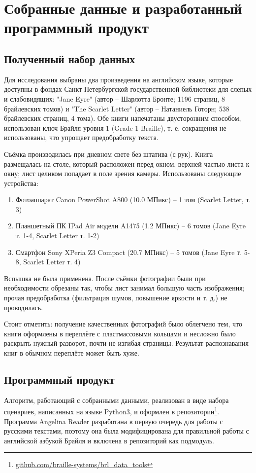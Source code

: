 \documentclass{main.tex}[subfiles]
\begin{document}
\section{Собранные данные и разработанный программный продукт}
\subsection{Полученный набор данных}

Для исследования выбраны два произведения на английском языке, которые доступны в фондах Санкт-Петербургской государственной библиотеки для слепых и слабовидящих: "Jane Eyre"\hspace{0pt} (автор -- Шарлотта Бронте; 1196 страниц, 8 брайлевских томов) и "The Scarlet Letter"\hspace{0pt} (автор -- Натаниель Готорн; 538 брайлевских страниц, 4 тома).
Обе книги напечатаны двусторонним способом, использован ключ Брайля уровня 1 (Grade 1 Braille), т. е. сокращения не использованы, что упрощает предобработку текста.

Съёмка производилась при дневном свете без штатива (с рук).
Книга размещалась на столе, который расположен перед окном, верхней частью листа к окну; лист целиком попадает в поле зрения камеры.
Использованы следующие устройства:

\begin{enumerate}[noitemsep]
    \item Фотоаппарат Canon PowerShot A800 (10.0 МПикс) -- 1 том (Scarlet Letter, т. 3)
    \item Планшетный ПК IPad Air модели A1475 (1.2 МПикс) -- 6 томов (Jane Eyre т. 1-4, Scarlet Letter т. 1-2)
    \item Смартфон Sony XPeria Z3 Compact (20.7 МПикс) -- 5 томов (Jane Eyre т. 5-8, Scarlet Letter т. 4)
\end{enumerate}
Вспышка не была применена.
После съёмки фотографии были при необходимости обрезаны так, чтобы лист занимал большую часть изображения; прочая предобработка (фильтрация шумов, повышение яркости и т. д.) не проводилась.

Стоит отметить: получение качественных фотографий было облегчено тем, что книги оформлены в переплёте с пластмассовыми кольцами и несложно было раскрыть нужный разворот, почти не изгибая страницы.
Результат распознавания книг в обычном переплёте может быть хуже.

\subsection{Программный продукт}

Алгоритм, работающий с собранными данными, реализован в виде набора сценариев, написанных на языке Python3, и оформлен в репозитории\footnote{\href{https://github.com/braille-systems/brl_data_tools}{github.com/braille-systems/brl\_data\_tools}}.
Программа Angelina Reader разработана в первую очередь для работы с русскими текстами, поэтому она была модифицирована для правильной работы с английской азбукой Брайля и включена в репозиторий как подмодуль.
\end{document}
